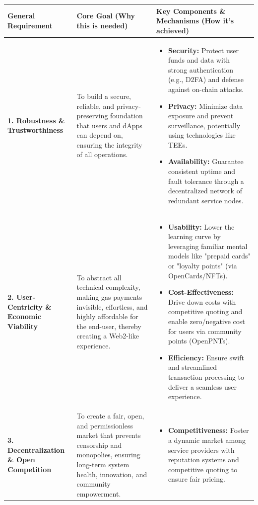 \documentclass[preprint,12pt]{elsarticle}
\begin{document}
\begin{table}[htbp]
\centering
\footnotesize
\renewcommand{\arraystretch}{0.9}
\begin{tabularx}{\textwidth}{|p{3cm}|X|X|}
\hline
\textbf{General Requirement} & \textbf{Core Goal (Why this is needed)} & \textbf{Key Components \& Mechanisms (How it's achieved)} \\
\hline
\textbf{1. Robustness \& Trustworthiness} & To build a secure, reliable, and privacy-preserving foundation that users and dApps can depend on, ensuring the integrity of all operations. & \begin{itemize}[noitemsep,topsep=0pt]
\item \textbf{Security:} Protect user funds and data with strong authentication (e.g., D2FA) and defense against on-chain attacks.
\item \textbf{Privacy:} Minimize data exposure and prevent surveillance, potentially using technologies like TEEs.
\item \textbf{Availability:} Guarantee consistent uptime and fault tolerance through a decentralized network of redundant service nodes.
\end{itemize} \\
\hline
\textbf{2. User-Centricity \& Economic Viability} & To abstract all technical complexity, making gas payments invisible, effortless, and highly affordable for the end-user, thereby creating a Web2-like experience. & \begin{itemize}[noitemsep,topsep=0pt]
\item \textbf{Usability:} Lower the learning curve by leveraging familiar mental models like "prepaid cards" or "loyalty points" (via OpenCards/NFTs).
\item \textbf{Cost-Effectiveness:} Drive down costs with competitive quoting and enable zero/negative cost for users via community points (OpenPNTs).
\item \textbf{Efficiency:} Ensure swift and streamlined transaction processing to deliver a seamless user experience.
\end{itemize} \\
\hline
\textbf{3. Decentralization \& Open Competition} & To create a fair, open, and permissionless market that prevents censorship and monopolies, ensuring long-term system health, innovation, and community empowerment. & \begin{itemize}[noitemsep,topsep=0pt]
\item \textbf{Competitiveness:} Foster a dynamic market among service providers with reputation systems and competitive quoting to ensure fair pricing.

\end{itemize}
\end{tabularx}
\end{table}
\end{document}

